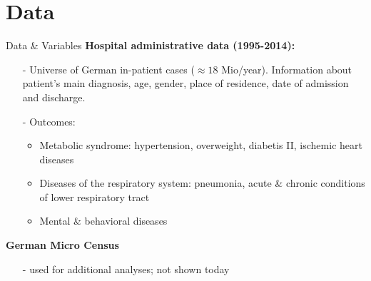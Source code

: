 \documentclass[usenames,dvipsnames]{beamer} %
\begin{document}
\section{Data}
\begin{frame}{Data \& Variables}
\textbf{Hospital administrative data (1995-2014):} 
\begin{itemize}
\item[-] Universe of German in-patient cases ($\approx 18$ Mio/year). \newline Information about patient's main diagnosis, age, gender, place of residence, date of admission and discharge.
\item[-] Outcomes: 
\begin{itemize}
\item Metabolic syndrome: hypertension, overweight, diabetis II, ischemic heart diseases
\item Diseases of the respiratory system: pneumonia, acute \& chronic conditions of lower respiratory tract
\item Mental \& behavioral diseases 
\end{itemize}
\end{itemize}

\textbf{German Micro Census}
\begin{itemize}
\item[-] used for additional analyses; not shown today
\end{itemize}

%
%
%
 

\end{frame}
\end{document}
